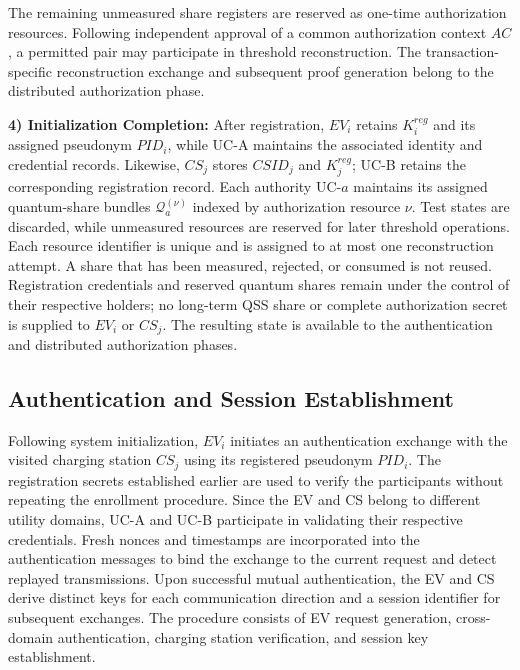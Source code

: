 \documentclass[twocolumn,10pt,journal]{IEEEtran}
\begin{document}
The remaining unmeasured share registers are reserved as
one-time authorization resources. Following independent
approval of a common authorization context $AC$, a permitted
pair may participate in threshold reconstruction. The
transaction-specific reconstruction exchange and subsequent
proof generation belong to the distributed authorization
phase.

\noindent\textbf{4) Initialization Completion:}
After registration, $EV_i$ retains $K_i^{reg}$ and its
assigned pseudonym $PID_i$, while UC-A maintains the
associated identity and credential records. Likewise,
$CS_j$ stores $CSID_j$ and $K_j^{reg}$; UC-B retains
the corresponding registration record. Each authority
UC-$a$ maintains its assigned quantum-share bundles
$\mathcal{Q}_{a}^{(\nu)}$ indexed by authorization resource
$\nu$. Test states are discarded, while unmeasured
resources are reserved for later threshold operations.
Each resource identifier is unique and is assigned to
at most one reconstruction attempt. A share that has
been measured, rejected, or consumed is not reused.
Registration credentials and reserved quantum shares
remain under the control of their respective holders;
no long-term QSS share or complete authorization secret
is supplied to $EV_i$ or $CS_j$. The resulting state is
available to the authentication and distributed
authorization phases.

\subsection{Authentication and Session Establishment}
\label{subsec:qsv2g_authentication}

Following system initialization, $EV_i$ initiates an
authentication exchange with the visited charging station
$CS_j$ using its registered pseudonym $PID_i$. The
registration secrets established earlier are used to
verify the participants without repeating the enrollment
procedure. Since the EV and CS belong to different utility
domains, UC-A and UC-B participate in validating their
respective credentials. Fresh nonces and timestamps are
incorporated into the authentication messages to bind
the exchange to the current request and detect replayed
transmissions. Upon successful mutual authentication,
the EV and CS derive distinct keys for each communication
direction and a session identifier for subsequent exchanges.
The procedure consists of EV request generation,
cross-domain authentication, charging station verification,
and session key establishment.
\end{document}
